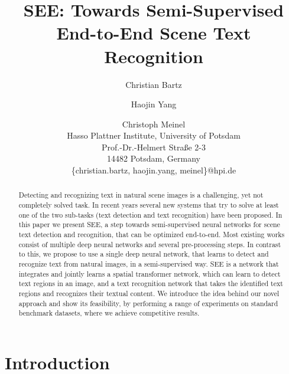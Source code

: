 \documentclass[letterpaper]{article}
\title{SEE: Towards Semi-Supervised End-to-End Scene Text Recognition}
\author{Christian Bartz \and Haojin Yang \and Christoph Meinel\\
Hasso Plattner Institute, University of Potsdam\\
Prof.-Dr.-Helmert Straße 2-3\\ 14482 Potsdam, Germany\\
\{christian.bartz, haojin.yang, meinel\}@hpi.de
}
\begin{document}
	\maketitle

	\begin{acronym}
	\end{acronym}

	\begin{abstract}
		Detecting and recognizing text in natural scene images is a challenging, yet not completely solved task.
		In recent years several new systems that try to solve at least one of the two sub-tasks (text detection and text recognition) have been proposed.
		In this paper we present SEE, a step towards semi-supervised neural networks for scene text detection and recognition, that can be optimized end-to-end.
		Most existing works consist of multiple deep neural networks and several pre-processing steps.
		In contrast to this, we propose to use a single deep neural network, that learns to detect and recognize text from natural images, in a semi-supervised way.
		SEE is a network that integrates and jointly learns a spatial transformer network, which can learn to detect text regions in an image, and a text recognition network that takes the identified text regions and recognizes their textual content.
		We introduce the idea behind our novel approach and show its feasibility, by performing a range of experiments on standard benchmark datasets, where we achieve competitive results.
	\end{abstract}

	\section{Introduction}
	\label{sec:introduction}
\end{document}
